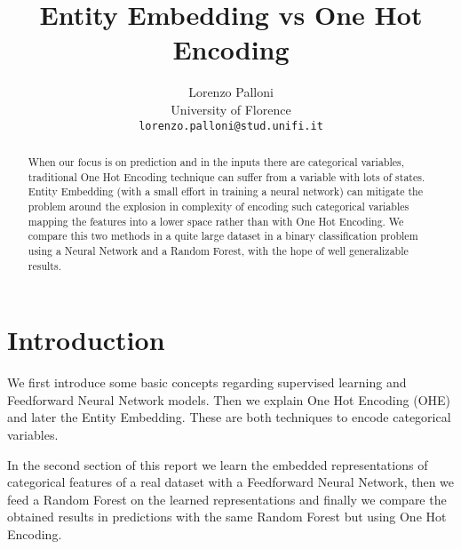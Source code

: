 \documentclass{article}
\title{Entity Embedding vs One Hot Encoding}
\author{%
  Lorenzo Palloni\\
  University of Florence\\
  \texttt{lorenzo.palloni@stud.unifi.it} \\
}
\begin{document}
\maketitle

\begin{abstract}
When our focus is on prediction and in the inputs there are categorical variables, traditional One Hot Encoding technique can suffer from a variable with lots of states. Entity Embedding (with a small effort in training a neural network) can mitigate the problem around the explosion in complexity of encoding such categorical variables mapping the features into a lower space rather than with One Hot Encoding.
We compare this two methods in a quite large dataset in a binary classification problem using a Neural Network and a Random Forest, with the hope of well generalizable results.
\end{abstract}

\section{Introduction}
We first introduce some basic concepts regarding supervised learning and Feedforward Neural Network models. Then we explain One Hot Encoding (OHE) and later the Entity Embedding\cite{guo}. These are both techniques to encode categorical variables.

In the second section of this report we learn the embedded representations of categorical features of a real dataset with a Feedforward Neural Network, then we feed a Random Forest on the learned representations and finally we compare the obtained results in predictions with the same Random Forest but using One Hot Encoding.
\end{document}

